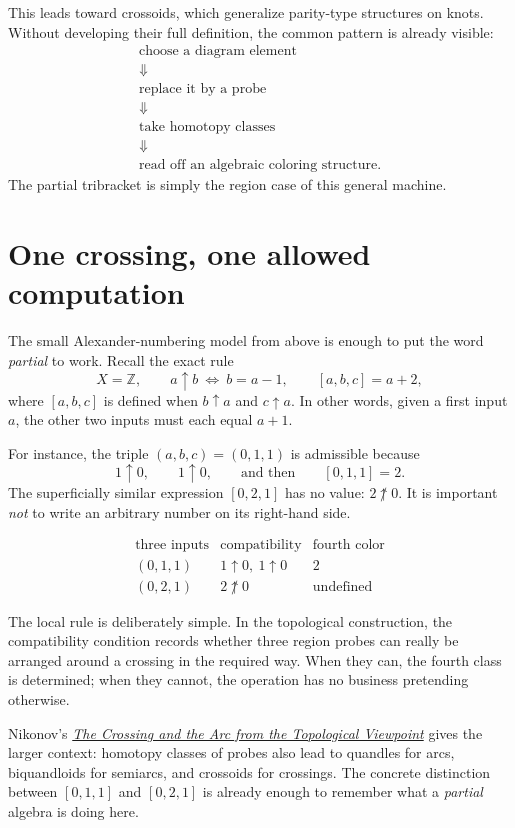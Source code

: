 This leads toward crossoids, which generalize parity-type structures on knots.  Without developing their full definition, the common pattern is already visible:
\[
\begin{array}{c}
\text{choose a diagram element}\\
\Downarrow\\
\text{replace it by a probe}\\
\Downarrow\\
\text{take homotopy classes}\\
\Downarrow\\
\text{read off an algebraic coloring structure.}
\end{array}
\]
The partial tribracket is simply the region case of this general machine.

\section{One crossing, one allowed computation}

The small Alexander-numbering model from above is enough to put the word \emph{partial} to work. Recall the exact rule
\[
 X=\mathbb Z,\qquad
 a\uparrow b\ \Longleftrightarrow\ b=a-1,\qquad
 [a,b,c]=a+2,
\]
where $[a,b,c]$ is defined when $b\uparrow a$ and $c\uparrow a$. In other words, given a first input $a$, the other two inputs must each equal $a+1$.

For instance, the triple $(a,b,c)=(0,1,1)$ is admissible because
\[
 1\uparrow0,\qquad1\uparrow0,
 \qquad\text{and then}\qquad
 \boxed{[0,1,1]=2.}
\]
The superficially similar expression $[0,2,1]$ has no value: $2\not\uparrow0$. It is important \emph{not} to write an arbitrary number on its right-hand side.

\[
\begin{array}{c|c|c}
 \text{three inputs}&\text{compatibility}&\text{fourth color}\\ \hline
 (0,1,1)&1\uparrow0,\ 1\uparrow0&2\\
 (0,2,1)&2\not\uparrow0&\text{undefined}
\end{array}
\]

The local rule is deliberately simple. In the topological construction, the compatibility condition records whether three region probes can really be arranged around a crossing in the required way. When they can, the fourth class is determined; when they cannot, the operation has no business pretending otherwise.

Nikonov's \href{https://arxiv.org/abs/2504.18836}{\emph{The Crossing and the Arc from the Topological Viewpoint}} gives the larger context: homotopy classes of probes also lead to quandles for arcs, biquandloids for semiarcs, and crossoids for crossings. The concrete distinction between $[0,1,1]$ and $[0,2,1]$ is already enough to remember what a \emph{partial} algebra is doing here.
